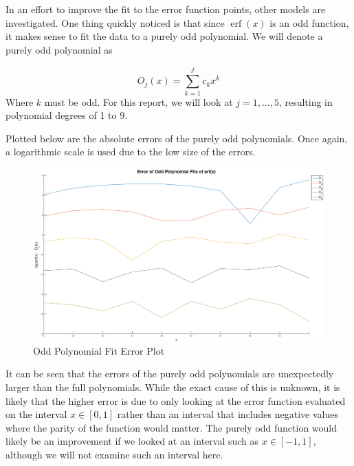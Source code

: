 \documentclass[10pt,a4paper]{article}
\DeclareMathOperator\erf{erf}
\begin{document}
\begin{multicols*}{2}
In an effort to improve the fit to the error function points, other models are investigated. One thing quickly noticed is that since $\erf{(x)}$ is an odd function, it makes sense to fit the data to a purely odd polynomial. We will denote a purely odd polynomial as

\begin{equation}
O_j(x) = \sum\limits_{k=1}^j c_k x^k
\label{eqn: odd polynomial}
\end{equation}
Where $k$ must be odd. For this report, we will look at $j = 1, ..., 5$, resulting in polynomial degrees of 1 to 9.

Plotted below are the absolute errors of the purely odd polynomials. Once again, a logarithmic scale is used due to the low size of the errors.

\begin{figure}[H]
\includegraphics[width=\columnwidth]{Figures/oddpolyerror.eps}
\caption{Odd Polynomial Fit Error Plot}
\label{fig: odderror}
\end{figure}

It can be seen that the errors of the purely odd polynomials are unexpectedly larger than the full polynomials. While the exact cause of this is unknown, it is likely that the higher error is due to only looking at the error function evaluated on the interval $x \in [0,1]$ rather than an interval that includes negative values where the parity of the function would matter. The purely odd function would likely be an improvement if we looked at an interval such as $x \in [-1,1]$, although we will not examine such an interval here.


\end{multicols*}
\end{document}
